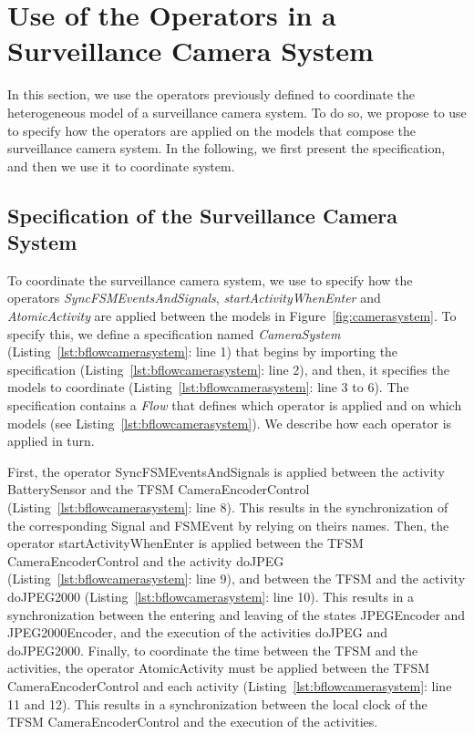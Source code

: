 \section{Use of the Operators in a Surveillance Camera System}
In this section, we use the operators previously defined to coordinate the heterogeneous model of a surveillance camera system. To do so, we propose to use \bflow to specify how the operators are applied on the models that compose the surveillance camera system. In the following, we first present the \bflow specification, and then we use it to coordinate system. 

\subsection{\bflow Specification of the Surveillance Camera System}
To coordinate the surveillance camera system, we use \bflow to specify how the operators \emph{SyncFSMEventsAndSignals}, \emph{startActivityWhenEnter} and \emph{AtomicActivity} are applied between the models in Figure~\ref{fig:camerasystem}. To specify this, we define a \bflow specification named \emph{CameraSystem} (Listing~\ref{lst:bflowcamerasystem}: line 1) that begins by importing the \bcool specification (Listing~\ref{lst:bflowcamerasystem}: line 2), and then, it specifies the models to coordinate (Listing~\ref{lst:bflowcamerasystem}: line 3 to 6). The specification contains a \emph{Flow} that defines which operator is applied and on which models (see Listing~\ref{lst:bflowcamerasystem}). We describe how each operator is applied in turn. 

First, the operator SyncFSMEventsAndSignals is applied between the activity BatterySensor and the TFSM CameraEncoderControl (Listing~\ref{lst:bflowcamerasystem}: line 8). This results in the synchronization of the corresponding Signal and FSMEvent by relying on theirs names. Then, the operator startActivityWhenEnter is applied between the TFSM CameraEncoderControl and the activity doJPEG (Listing~\ref{lst:bflowcamerasystem}: line 9), and between the TFSM and the activity doJPEG2000 (Listing~\ref{lst:bflowcamerasystem}: line 10). This results in a synchronization between the entering and leaving of the states JPEGEncoder and  JPEG2000Encoder, and the execution of the activities doJPEG and doJPEG2000. Finally, to coordinate the time between the TFSM and the activities, the operator AtomicActivity must be applied between the TFSM CameraEncoderControl and each activity (Listing~\ref{lst:bflowcamerasystem}: line 11 and 12). This results in a synchronization between the local clock of the TFSM CameraEncoderControl and the execution of the activities. 


